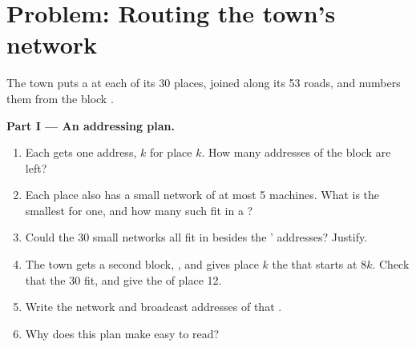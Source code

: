\section{Problem: Routing the town's network}\label{sec:b2:network-layer:problem}

\begin{problem}\label{pb:b2:network-layer:1}
The town puts a  at each of its 30 places, joined along its 53 roads, and numbers them from the block
.

\medskip\noindent\textbf{Part I --- An addressing plan.}\par\nopagebreak
\begin{enumerate}
\item Each  gets one address, $k$ for place $k$. How many addresses of the block are left?
\item Each place also has a small network of at most 5 machines. What is the smallest  for one, and how many
such  fit in a ?
\item Could the 30 small networks all fit in  besides the ' addresses? Justify.
\item The town gets a second block, , and gives place $k$ the  that starts at
$8k$. Check that the 30  fit, and give the  of place 12.
\item Write the network and broadcast addresses of that .
\item Why does this plan make  easy to read?
\end{enumerate}


\end{problem}
